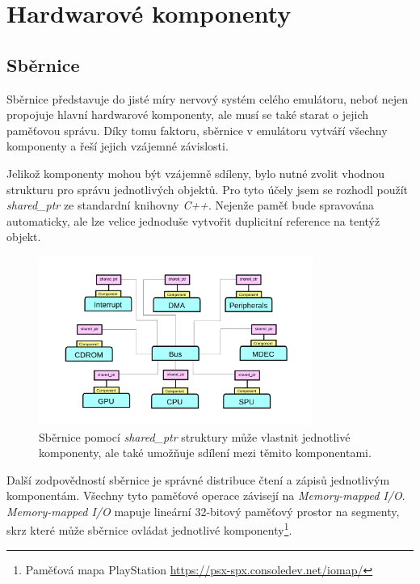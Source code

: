\chapter{Hardwarové komponenty}

\section{Sběrnice}

Sběrnice představuje do jisté míry nervový systém celého emulátoru, neboť nejen propojuje hlavní 
hardwarové komponenty, ale musí se také starat o jejich paměťovou správu. 
Díky tomu faktoru, sběrnice v emulátoru vytváří všechny komponenty a řeší jejich vzájemné závislosti.

Jelikož komponenty mohou být vzájemně sdíleny, bylo nutné zvolit vhodnou 
strukturu pro správu jednotlivých objektů. Pro tyto účely jsem se rozhodl použít \textit{shared\_ptr} ze 
standardní knihovny \textit{C++}. Nejenže paměť bude spravována automaticky, ale lze velice jednoduše vytvořit duplicitní reference na tentýž objekt.

\begin{figure}[hbt]
\centering
\includegraphics[width=0.8\textwidth]{obrazky-figures/bus-ownage.png}
\caption{Sběrnice pomocí \textit{shared\_ptr} struktury může vlastnit jednotlivé komponenty, ale také umožňuje sdílení mezi těmito komponentami.}
\label{bus-ownage}
\end{figure}

Další zodpovědností sběrnice je správné distribuce čtení a zápisů jednotlivým komponentám. 
Všechny tyto paměťové operace závisejí na \textit{Memory-mapped I/O}. \textit{Memory-mapped I/O} mapuje 
lineární 32-bitový paměťový prostor na segmenty, skrz které může sběrnice ovládat jednotlivé komponenty\footnote{Paměťová mapa PlayStation\cite{PSXSpec} \url{https://psx-spx.consoledev.net/iomap/}}.

